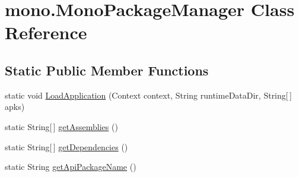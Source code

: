 \hypertarget{classmono_1_1_mono_package_manager}{\section{mono.\+Mono\+Package\+Manager Class Reference}
\label{classmono_1_1_mono_package_manager}
}
\subsection*{Static Public Member Functions}
\begin{DoxyCompactItemize}
\item 
static void \hyperlink{classmono_1_1_mono_package_manager_aa35d518f63e12fb23466da9e2531f447}{Load\+Application} (Context context, String runtime\+Data\+Dir, String\mbox{[}$\,$\mbox{]} apks)
\item 
static String\mbox{[}$\,$\mbox{]} \hyperlink{classmono_1_1_mono_package_manager_a4db80b0afa9fab894e267e09bc3da334}{get\+Assemblies} ()
\item 
static String\mbox{[}$\,$\mbox{]} \hyperlink{classmono_1_1_mono_package_manager_a708931514353feff12f2cc9d99865a9e}{get\+Dependencies} ()
\item 
static String \hyperlink{classmono_1_1_mono_package_manager_a009d16dedf56862f4a23ee05e180e028}{get\+Api\+Package\+Name} ()
\end{DoxyCompactItemize}


